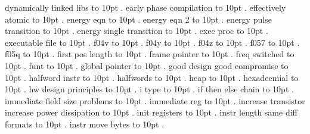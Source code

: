 \smallskip
dynamically linked libs \leaders\hbox to 10pt {\hss.\hss}  \hfill {}
\smallskip
early phase compilation \leaders\hbox to 10pt {\hss.\hss}  \hfill {}
\smallskip
effectively atomic \leaders\hbox to 10pt {\hss.\hss}  \hfill {}
\smallskip
energy eqn \leaders\hbox to 10pt {\hss.\hss}  \hfill {}
\smallskip
energy eqn 2 \leaders\hbox to 10pt {\hss.\hss}  \hfill {}
\smallskip
energy pulse transition \leaders\hbox to 10pt {\hss.\hss}  \hfill {}
\smallskip
energy single transition \leaders\hbox to 10pt {\hss.\hss}  \hfill {}
\smallskip
exec proc \leaders\hbox to 10pt {\hss.\hss}  \hfill {}
\smallskip
executable file \leaders\hbox to 10pt {\hss.\hss}  \hfill {}
\smallskip
f04v \leaders\hbox to 10pt {\hss.\hss}  \hfill {}
\smallskip
f04y \leaders\hbox to 10pt {\hss.\hss}  \hfill {}
\smallskip
f04z \leaders\hbox to 10pt {\hss.\hss}  \hfill {}
\smallskip
f057 \leaders\hbox to 10pt {\hss.\hss}  \hfill {}
\smallskip
f05q \leaders\hbox to 10pt {\hss.\hss}  \hfill {}
\smallskip
first pos length \leaders\hbox to 10pt {\hss.\hss}  \hfill {}
\smallskip
frame pointer \leaders\hbox to 10pt {\hss.\hss}  \hfill {}
\smallskip
freq switched \leaders\hbox to 10pt {\hss.\hss}  \hfill {}
\smallskip
funt \leaders\hbox to 10pt {\hss.\hss}  \hfill {}
\smallskip
global pointer \leaders\hbox to 10pt {\hss.\hss}  \hfill {}
\smallskip
good design good compromise \leaders\hbox to 10pt {\hss.\hss}  \hfill {}
\smallskip
halfword instr \leaders\hbox to 10pt {\hss.\hss}  \hfill {}
\smallskip
halfwords \leaders\hbox to 10pt {\hss.\hss}  \hfill {}
\smallskip
heap \leaders\hbox to 10pt {\hss.\hss}  \hfill {}
\smallskip
hexadecmial \leaders\hbox to 10pt {\hss.\hss}  \hfill {}
\smallskip
hw design principles \leaders\hbox to 10pt {\hss.\hss}  \hfill {}
\smallskip
i type \leaders\hbox to 10pt {\hss.\hss}  \hfill {}
\smallskip
if then else chain \leaders\hbox to 10pt {\hss.\hss}  \hfill {}
\smallskip
immediate field size problems \leaders\hbox to 10pt {\hss.\hss}  \hfill {}
\smallskip
immediate reg \leaders\hbox to 10pt {\hss.\hss}  \hfill {}
\smallskip
increase transistor increase power dissipation \leaders\hbox to 10pt {\hss.\hss}  \hfill {}
\smallskip
init registers \leaders\hbox to 10pt {\hss.\hss}  \hfill {}
\smallskip
instr length same diff formats \leaders\hbox to 10pt {\hss.\hss}  \hfill {}
\smallskip
instr move bytes \leaders\hbox to 10pt {\hss.\hss}  \hfill {}
